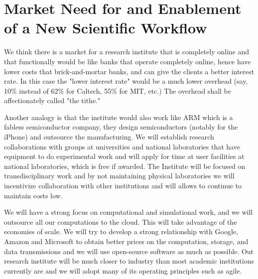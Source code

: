 \section{Market Need for and Enablement of a New Scientific Workflow}

We think there is a market for a research institute that is completely online and that functionally would be like banks that operate completely online, hence have lower costs that brick-and-mortar banks, and can give the clients a better interest rate. In this case the "lower interest rate" would be a much lower overhead (say, 10\% instead of 62\% for Caltech, 55\% for MIT, etc.) The overhead shall be affectionately called "the tithe."

Another analogy is that the institute would also work like ARM which is a fabless semiconductor company, they design semiconductors (notably for the iPhone) and outsource the manufacturing. We will establish research collaborations with groups at universities and national laboratories that have equipment to do experimental work and will apply for time at user facilities at national laboratories, which is free if awarded. The Institute will be focused on transdisciplinary work and by not maintaining physical laboratories we will incentivize collaboration with other institutions and will allows to continue to maintain costs low. 

We will have a strong focus on computational and simulational work, and we will outsource all our computations to the cloud. This will take advantage of the economies of scale. We will try to develop a strong relationship with Google, Amazon and Microsoft to obtain better prices on the computation, storage, and data transmissions and we will use open-source software as much as possible. Out research institute will be much closer to industry than most academic institutions currently are and we will adopt many of its operating principles such as agile. 

